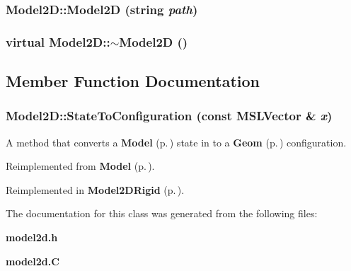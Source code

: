 \subsubsection{\setlength{\rightskip}{0pt plus 5cm}Model2D::Model2D (string {\em path})}\label{classModel2D_a0}


\subsubsection{\setlength{\rightskip}{0pt plus 5cm}virtual Model2D::$\sim$Model2D ()\hspace{0.3cm}{\tt  [inline, virtual]}}\label{classModel2D_a1}




\subsection{Member Function Documentation}
\subsubsection{ Model2D::State\-To\-Configuration (const {\bf MSLVector} \& {\em x})\hspace{0.3cm}{\tt  [virtual]}}\label{classModel2D_a2}


A method that converts a {\bf Model} {\rm (p.\,\pageref{classModel})} state in to a {\bf Geom} {\rm (p.\,\pageref{classGeom})} configuration.



Reimplemented from {\bf Model} {\rm (p.\,\pageref{classModel_a8})}.

Reimplemented in {\bf Model2DRigid} {\rm (p.\,\pageref{classModel2DRigid_a7})}.

The documentation for this class was generated from the following files:\begin{CompactItemize}
\item 
{\bf model2d.h}\item 
{\bf model2d.C}\end{CompactItemize}
